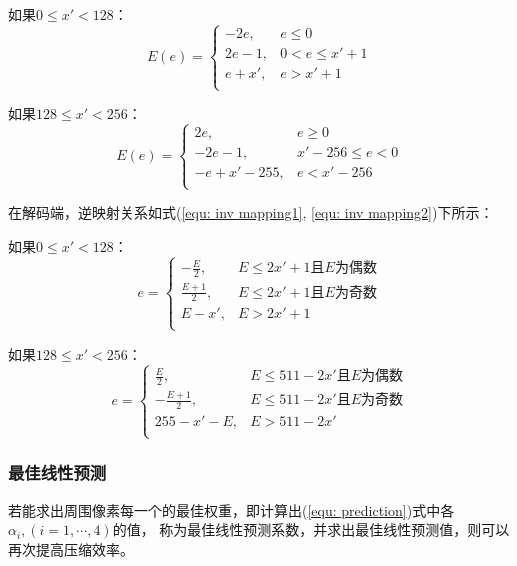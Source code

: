 \documentclass[12pt,a4paper]{article}%
\begin{document}
如果$0\le x'<128$：
\begin{equation}
    E\left( e \right) =\left\{ \begin{matrix}
        -2e,  & e\le 0      \\
        2e-1, & 0<e\le x'+1 \\
        e+x', & e>x'+1      \\
    \end{matrix} \right.
    \label{equ: mapping1}
\end{equation}

如果$128\le x'<256$：
\begin{equation}
    E\left( e \right) =\left\{ \begin{matrix}
        2e,        & e\ge 0        \\
        -2e-1,     & x'-256\le e<0 \\
        -e+x'-255, & e<x'-256      \\
    \end{matrix} \right.
    \label{equ: mapping2}
\end{equation}

在解码端，逆映射关系如式(\ref{equ: inv mapping1}, \ref{equ: inv mapping2})下所示：

如果$0\le x'<128$：
\begin{equation}
    e=\left\{ \begin{matrix}
        -\frac{E}{2},  & E\le 2x'+1\text{且}E\text{为偶数} \\
        \frac{E+1}{2}, & E\le 2x'+1\text{且}E\text{为奇数} \\
        E-x',          & E>2x'+1                           \\
    \end{matrix} \right.
    \label{equ: inv mapping1}
\end{equation}

如果$128\le x'<256$：
\begin{equation}
    e=\left\{ \begin{matrix}
        \frac{E}{2},    & E\le 511-2x'\text{且}E\text{为偶数} \\
        -\frac{E+1}{2}, & E\le 511-2x'\text{且}E\text{为奇数} \\
        255-x'-E,       & E>511-2x'                           \\
    \end{matrix} \right.
    \label{equ: inv mapping2}
\end{equation}


\subsubsection{最佳线性预测}
若能求出周围像素每一个的最佳权重，即计算出(\ref{equ: prediction})式中各$\alpha_i,(i=1,\cdots,4)$的值，
称为最佳线性预测系数，并求出最佳线性预测值，则可以再次提高压缩效率。
\end{document}
